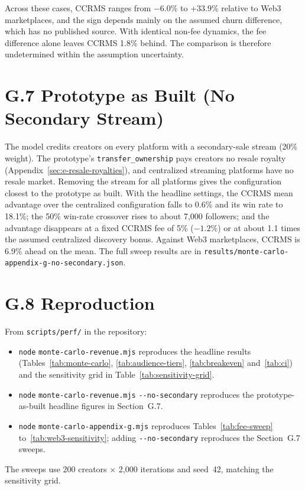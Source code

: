 Across these cases, CCRMS ranges from $-$6.0\% to +33.9\% relative to Web3 marketplaces, and the sign depends mainly on the assumed churn difference, which has no published source. With identical non-fee dynamics, the fee difference alone leaves CCRMS 1.8\% behind. The comparison is therefore undetermined within the assumption uncertainty.

\section*{G.7 Prototype as Built (No Secondary Stream)}

The model credits creators on every platform with a secondary-sale stream (20\% weight). The prototype's \texttt{transfer\_ownership} pays creators no resale royalty (Appendix~\ref{sec:e-resale-royalties}), and centralized streaming platforms have no resale market. Removing the stream for all platforms gives the configuration closest to the prototype as built. With the headline settings, the CCRMS mean advantage over the centralized configuration falls to 0.6\% and its win rate to 18.1\%; the 50\% win-rate crossover rises to about 7,000 followers; and the advantage disappears at a fixed CCRMS fee of 5\% ($-1.2\%$) or at about 1.1 times the assumed centralized discovery bonus. Against Web3 marketplaces, CCRMS is 6.9\% ahead on the mean. The full sweep results are in \texttt{results/\allowbreak monte-carlo-\allowbreak appendix-g-\allowbreak no-secondary.json}.

\section*{G.8 Reproduction}

From \texttt{scripts/perf/} in the repository:

{\raggedright
\begin{itemize}
\item \texttt{node} \texttt{monte-carlo-\allowbreak revenue.mjs} reproduces the headline results (Tables~\ref{tab:monte-carlo}, \ref{tab:audience-tiers}, \ref{tab:breakeven} and~\ref{tab:ci}) and the sensitivity grid in Table~\ref{tab:sensitivity-grid}.
\item \texttt{node} \texttt{monte-carlo-\allowbreak revenue.mjs} \texttt{-{}-no-secondary} reproduces the prototype-as-built headline figures in Section~G.7.
\item \texttt{node} \texttt{monte-carlo-\allowbreak appendix-g.mjs} reproduces Tables~\ref{tab:fee-sweep} to~\ref{tab:web3-sensitivity}; adding \texttt{-{}-no-secondary} reproduces the Section~G.7 sweeps.
\end{itemize}
}

The sweeps use 200 creators $\times$ 2,000 iterations and seed~42, matching the sensitivity grid.
